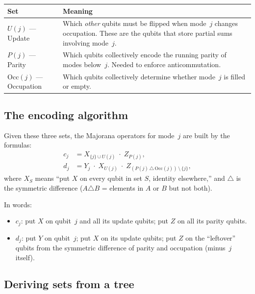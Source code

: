 \documentclass[11pt,a4paper]{article}
\newcommand{\Occ}[1]{\mathrm{Occ}(#1)}
\theoremstyle{definition}
\begin{document}
\begin{center}
\begin{tabular}{@{}lp{8cm}@{}}
\toprule
\textbf{Set} & \textbf{Meaning} \\
\midrule
$U(j)$ --- Update &
  Which \emph{other} qubits must be flipped when mode~$j$ changes
  occupation.  These are the qubits that store partial sums
  involving mode~$j$. \\
$P(j)$ --- Parity &
  Which qubits collectively encode the running parity of modes
  below~$j$.  Needed to enforce anticommutation. \\
$\Occ{j}$ --- Occupation &
  Which qubits collectively determine whether mode~$j$ is filled
  or empty. \\
\bottomrule
\end{tabular}
\end{center}

\subsection{The encoding algorithm}

Given these three sets, the Majorana operators for mode~$j$ are built
by the formulas:
\begin{align}
  c_j &= X_{\{j\} \cup U(j)} \;\cdot\; Z_{P(j)},
  \label{eq:cj-consA} \\[4pt]
  d_j &= Y_j \;\cdot\; X_{U(j)} \;\cdot\;
    Z_{(P(j)\,\triangle\,\Occ{j})\,\setminus\,\{j\}},
  \label{eq:dj-consA}
\end{align}
where $X_S$ means ``put $X$ on every qubit in set $S$, identity
elsewhere,'' and $\triangle$ is the symmetric difference ($A
\triangle B$ = elements in $A$ or $B$ but not both).

In words:
\begin{itemize}
  \item $c_j$: put $X$ on qubit~$j$ and all its update qubits;
    put $Z$ on all its parity qubits.
  \item $d_j$: put $Y$ on qubit~$j$; put $X$ on its update qubits;
    put $Z$ on the ``leftover'' qubits from the symmetric difference
    of parity and occupation (minus~$j$ itself).
\end{itemize}

\subsection{Deriving sets from a tree}
\end{document}
